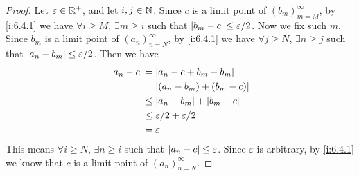 \begin{proof}
  Let \(\varepsilon \in \mathbb{R}^+\), and let \(i, j \in \mathbb{N}\).
  Since \(c\) is a limit point of \((b_m)_{m = M}^\infty\), by \cref{i:6.4.1} we have \(\forall i \geq M\), \(\exists m \geq i\) such that \(\left\lvert b_m - c\right\rvert \leq \varepsilon / 2\).
  Now we fix such \(m\).
  Since \(b_m\) is a limit point of \((a_n)_{n = N}^\infty\), by \cref{i:6.4.1} we have \(\forall j \geq N\), \(\exists n \geq j\) such that \(\left\lvert a_n - b_m\right\rvert \leq \varepsilon / 2\).
  Then we have
  \begin{align*}
    \left\lvert a_n - c\right\rvert & = \left\lvert a_n - c + b_m - b_m\right\rvert            \\
                  & = \left\lvert(a_n - b_m) + (b_m - c)\right\rvert        \\
                  & \leq \left\lvert a_n - b_m\right\rvert + \left\lvert b_m - c\right\rvert   \\
                  & \leq \varepsilon / 2 + \varepsilon / 2 \\
                  & = \varepsilon
  \end{align*}
  This means \(\forall i \geq N\), \(\exists n \geq i\) such that \(\left\lvert a_n - c\right\rvert \leq \varepsilon\).
  Since \(\varepsilon\) is arbitrary, by \cref{i:6.4.1} we know that \(c\) is a limit point of \((a_n)_{n = N}^\infty\).
\end{proof}
